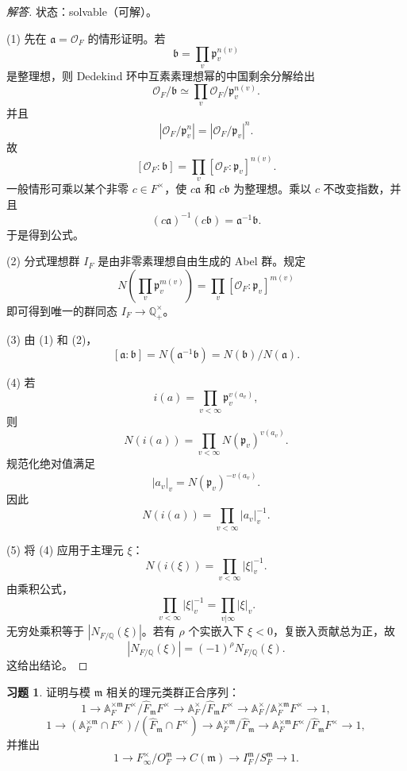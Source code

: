 \documentclass[11pt,a4paper,openany]{ctexbook}
\numberwithin{equation}{chapter}
\newcommand{\Q}{\mathbb{Q}}
\newcommand{\A}{\mathbb{A}}
\theoremstyle{plain}
\theoremstyle{definition}
\newtheorem{exercise}[theorem]{习题}
\theoremstyle{remark}
\begin{document}
\begin{proof}[解答]
状态：solvable（可解）。

(1) 先在 $\mathfrak a=\mathcal O_F$ 的情形证明。若
\[
 \mathfrak b=\prod_v\mathfrak p_v^{n(v)}
\]
是整理想，则 Dedekind 环中互素素理想幂的中国剩余分解给出
\[
 \mathcal O_F/\mathfrak b\simeq
 \prod_v \mathcal O_F/\mathfrak p_v^{n(v)}.
\]
并且
\[
 |\mathcal O_F/\mathfrak p_v^{n}|
 =|\mathcal O_F/\mathfrak p_v|^n.
\]
故
\[
 [\mathcal O_F:\mathfrak b]
 =\prod_v[\mathcal O_F:\mathfrak p_v]^{n(v)}.
\]
一般情形可乘以某个非零 $c\in F^\times$，使 $c\mathfrak a$ 和 $c\mathfrak b$ 为整理想。乘以 $c$ 不改变指数，并且
\[
 (c\mathfrak a)^{-1}(c\mathfrak b)=\mathfrak a^{-1}\mathfrak b.
\]
于是得到公式。

(2) 分式理想群 $I_F$ 是由非零素理想自由生成的 Abel 群。规定
\[
 N\left(\prod_v\mathfrak p_v^{m(v)}\right)
 =\prod_v[\mathcal O_F:\mathfrak p_v]^{m(v)}
\]
即可得到唯一的群同态 $I_F\to\Q_+^\times$。

(3) 由 (1) 和 (2)，
\[
 [\mathfrak a:\mathfrak b]
 =N(\mathfrak a^{-1}\mathfrak b)
 =N(\mathfrak b)/N(\mathfrak a).
\]

(4) 若
\[
 i(a)=\prod_{v<\infty}\mathfrak p_v^{v(a_v)},
\]
则
\[
 N(i(a))=\prod_{v<\infty}N(\mathfrak p_v)^{v(a_v)}.
\]
规范化绝对值满足
\[
 |a_v|_v=N(\mathfrak p_v)^{-v(a_v)}.
\]
因此
\[
 N(i(a))=\prod_{v<\infty}|a_v|_v^{-1}.
\]

(5) 将 (4) 应用于主理元 $\xi$：
\[
 N(i(\xi))=\prod_{v<\infty}|\xi|_v^{-1}.
\]
由乘积公式，
\[
 \prod_{v<\infty}|\xi|_v^{-1}
 =\prod_{v|\infty}|\xi|_v.
\]
无穷处乘积等于 $|N_{F/\Q}(\xi)|$。若有 $\rho$ 个实嵌入下 $\xi<0$，复嵌入贡献总为正，故
\[
 |N_{F/\Q}(\xi)|=(-1)^\rho N_{F/\Q}(\xi).
\]
这给出结论。
\end{proof}

\begin{exercise}
证明与模 $\mathfrak m$ 相关的理元类群正合序列：
\[
1\to
\A_F^{\times\mathfrak m}F^\times/\widehat F_{\mathfrak m}F^\times
\to
\A_F^\times/\widehat F_{\mathfrak m}F^\times
\to
\A_F^\times/\A_F^{\times\mathfrak m}F^\times
\to1,
\]
\[
1\to
(\A_F^{\times\mathfrak m}\cap F^\times)/(\widehat F_{\mathfrak m}\cap F^\times)
\to
\A_F^{\times\mathfrak m}/\widehat F_{\mathfrak m}
\to
\A_F^{\times\mathfrak m}F^\times/\widehat F_{\mathfrak m}F^\times
\to1,
\]
并推出
\[
1\to F_\infty^\times/O_F^{\mathfrak m}
\to C(\mathfrak m)\to I_F^{\mathfrak m}/S_F^{\mathfrak m}\to1.
\]
\end{exercise}
\end{document}
